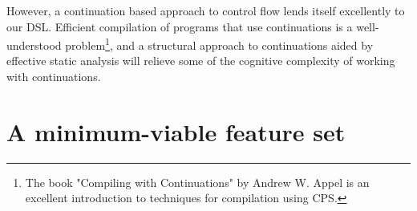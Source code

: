 However, a continuation based approach to control flow lends itself excellently to our \ac{DSL}. Efficient compilation of programs that use continuations is a well-understood problem\footnote{The book "Compiling with Continuations" by Andrew W. Appel \cite{Appel1992} is an excellent introduction to techniques for compilation using \acf{CPS}.}, and a structural approach to continuations aided by effective static analysis will relieve some of the cognitive complexity of working with continuations.


\section{A minimum-viable feature set}
\label{sec:design_features}

